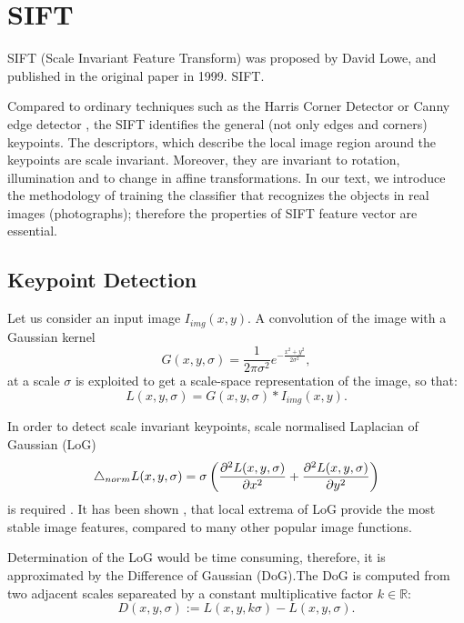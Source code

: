 \section{SIFT}
SIFT (Scale Invariant Feature Transform) was  proposed by David Lowe, and published in the original paper \cite{Lowe1999} in 1999. SIFT.

Compared to ordinary techniques such as the Harris Corner Detector \cite{Harris1988} or Canny edge detector \cite{Canny1986}, the SIFT identifies the general (not only edges and corners) keypoints. The descriptors, which describe the local image region around the keypoints are scale invariant. Moreover, they are invariant to rotation, illumination and to change in affine transformations. In our text, we introduce the methodology of training the classifier that recognizes the objects in real images (photographs); therefore the properties of SIFT feature vector are essential.

\subsection{Keypoint Detection}

Let us consider an input image \( I_{img}(x,y) \). A convolution of the image with a Gaussian kernel
\begin{equation}
    G(x,y,\sigma) = \frac{1}{2\pi\sigma^2}e^{-\frac{x^2+y^2}{2\sigma^2}},
    \label{eq:Gaussian_kernel}
\end{equation}
at a scale \( \sigma \) is exploited to get a scale-space representation of the image, so that:
\begin{equation}
    L(x, y,\sigma) =  G(x,y,\sigma)*I_{img}(x,y).
\end{equation}

In order to detect scale invariant keypoints, scale normalised Laplacian of Gaussian (LoG)
\begin{equation}
    \mathop{}\!\mathbin\bigtriangleup_{norm} L(x, y, \sigma) = \sigma\left(\frac{\partial^2 L(x,y,\sigma)}{\partial x^2} + \frac{\partial^2 L(x,y,\sigma)}{\partial y^2}\right)
\end{equation}
is required \cite{Koenderink1984}. It has been shown \cite{Mikolajczyk2002}, that local extrema of LoG provide the most stable image features, compared to many other popular image functions.

Determination of the LoG would be time consuming, therefore, it is approximated by the Difference of Gaussian (DoG)\cite{Lowe2004}.The DoG is computed from two adjacent scales separeated by a constant multiplicative factor $k \in \mathbb{R}$:
\begin{equation}
    D(x,y,\sigma) := L(x,y,k\sigma) - L(x,y,\sigma).
\end{equation}

